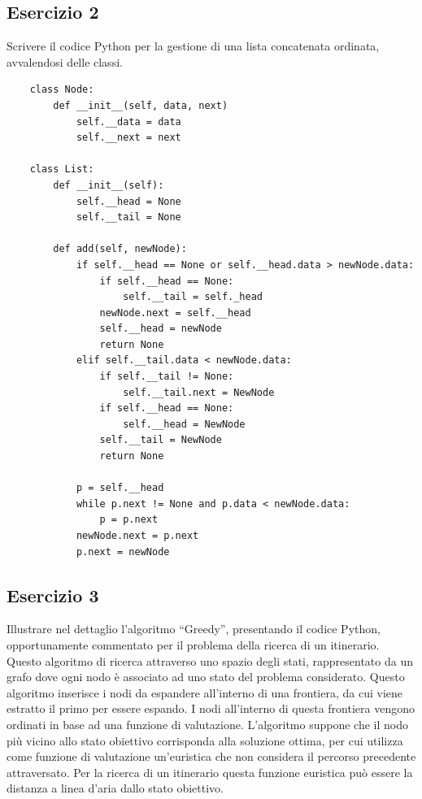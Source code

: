 \documentclass{article}
\numberwithin{equation}{subsection}
\begin{document}
\subsection*{Esercizio 2}

Scrivere il codice Python per la gestione di una lista concatenata ordinata, avvalendosi delle classi. \\
\begin{verbatim}
    class Node:
        def __init__(self, data, next)
            self.__data = data
            self.__next = next

    class List:
        def __init__(self):
            self.__head = None
            self.__tail = None

        def add(self, newNode):            
            if self.__head == None or self.__head.data > newNode.data:
                if self.__head == None:
                    self.__tail = self._head
                newNode.next = self.__head
                self.__head = newNode
                return None
            elif self.__tail.data < newNode.data:
                if self.__tail != None:
                    self.__tail.next = NewNode
                if self.__head == None:
                    self.__head = NewNode
                self.__tail = NewNode
                return None
            
            p = self.__head
            while p.next != None and p.data < newNode.data:
                p = p.next
            newNode.next = p.next
            p.next = newNode
\end{verbatim}

\subsection*{Esercizio 3}

Illustrare nel dettaglio l'algoritmo ``Greedy'', presentando il codice Python, opportunamente commentato per il problema della ricerca di un 
itinerario. \\
Questo algoritmo di ricerca attraverso uno spazio degli stati, rappresentato da un grafo dove ogni nodo è associato ad uno stato del problema considerato. 
Questo algoritmo inserisce i nodi da espandere all'interno di una frontiera, da cui viene estratto il primo per essere espando. I nodi all'interno di questa 
frontiera vengono ordinati in base ad una funzione di valutazione. L'algoritmo suppone che il nodo più vicino allo stato obiettivo corrisponda alla soluzione ottima, 
per cui utilizza come funzione di valutazione un'euristica che non considera il percorso precedente attraversato. Per la ricerca di un itinerario questa funzione 
euristica può essere la distanza a linea d'aria dallo stato obiettivo. 







\end{document}
